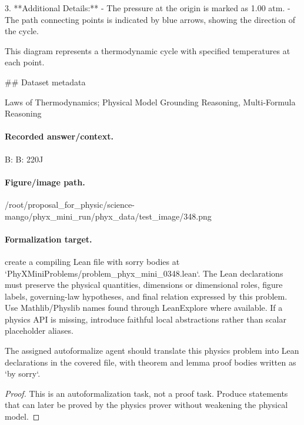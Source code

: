 3. **Additional Details:**
   - The pressure at the origin is marked as 1.00 atm.
   - The path connecting points is indicated by blue arrows, showing the direction of the cycle.

This diagram represents a thermodynamic cycle with specified temperatures at each point.

\#\# Dataset metadata

Laws of Thermodynamics; Physical Model Grounding Reasoning, Multi-Formula Reasoning

\paragraph{Recorded answer/context.}
B: B: 220J

\paragraph{Figure/image path.}
/root/proposal\_for\_physic/science-mango/phyx\_mini\_run/phyx\_data/test\_image/348.png

\paragraph{Formalization target.}
create a compiling Lean file with sorry bodies at `PhyXMiniProblems/problem\_phyx\_mini\_0348.lean`. The Lean declarations must preserve the physical quantities, dimensions or dimensional roles, figure labels, governing-law hypotheses, and final relation expressed by this problem.
Use Mathlib/Physlib names found through LeanExplore where available. If a physics API is missing, introduce faithful local abstractions rather than scalar placeholder aliases.

\begin{theorem}
\label{thm:physics:phyx_mini_0348:target}
The assigned autoformalize agent should translate this physics problem into Lean declarations in the covered file, with theorem and lemma proof bodies written as `by sorry`.
\end{theorem}
\begin{proof}
This is an autoformalization task, not a proof task. Produce statements that can later be proved by the physics prover without weakening the physical model.
\end{proof}

